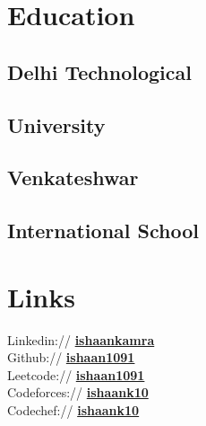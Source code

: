 \documentclass[]{ishaan-kamra-resume}
\begin{document}
\begin{minipage}[t]{0.33\textwidth}


    \section{Education}

    \subsection{Delhi Technological}
    \subsection{University}
    \sectionsep

    \subsection{Venkateshwar}
    \subsection{International School}
    \sectionsep



    \section{Links}
    Linkedin:// \href{https://www.linkedin.com/in/ishaankamra/}{\bf ishaankamra} \\
    Github:// \href{https://github.com/ishaan1091}{\bf ishaan1091} \\
    Leetcode://  \href{https://leetcode.com/ishaan1091/}{\bf ishaan1091} \\
    Codeforces://  \href{https://codeforces.com/profile/ishaank10}{\bf ishaank10} \\
    Codechef://  \href{https://www.codechef.com/users/ishaank10}{\bf ishaank10}



\end{minipage}
\end{document}
